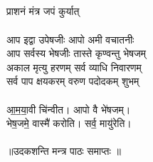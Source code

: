 \subsection{}
प्राशनं मंत्र जपं कुर्यात् \\
\\
आप इद्वा उपेषजीः आपो अमी वचातनीः \\
आप सर्वस्य भेषजीः तास्ते कृण्वन्तु भेषजम् \\
अकाल मृत्यु हरणम् सर्व व्याधि निवारणम् \\
सर्व पाप क्षयकरम् वरुण पदोदकम् शुभम् \\
\\
आ॒म॒या॒वी चि॑न्वीत। आपो वै भे॑षजम्। \\
भेष॒जमे॒ वास्मै॑ करोति। सर्व॒ मायु॑रेति। \\
\\
॥उदकशन्ति मन्त्र पाठः समाप्तः ॥\\

